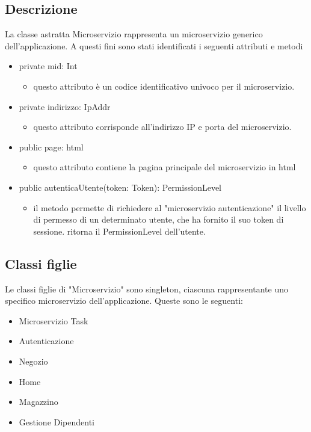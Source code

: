 \documentclass{report}
\begin{document}
\subsection*{Descrizione}
La classe astratta Microservizio rappresenta un microservizio generico dell'applicazione.
A questi fini sono stati identificati i seguenti attributi e metodi
\begin{itemize}
	\item private mid: Int 
	\begin{itemize}
		\item questo attributo è un codice identificativo univoco per il microservizio.
	\end{itemize}
	\item private indirizzo: IpAddr
	\begin{itemize}
		\item questo attributo corrisponde all'indirizzo IP e porta del microservizio.
	\end{itemize}
	\item public page: html
	\begin{itemize}
		\item questo attributo contiene la pagina principale del microservizio in html 
	\end{itemize}
	
	\item public autenticaUtente(token: Token): PermissionLevel 
	\begin{itemize}
		\item il metodo permette di richiedere al "microservizio autenticazione" il livello di permesso di un determinato utente, che ha fornito il suo token di sessione. ritorna il PermissionLevel dell'utente.
	\end{itemize}
\end{itemize}
\subsection*{Classi figlie}
Le classi figlie di "Microservizio" sono singleton, ciascuna rappresentante uno specifico microservizio dell'applicazione.
Queste sono le seguenti:
\begin{itemize}
	\item Microservizio Task
	\item Autenticazione
	\item Negozio
	\item Home
	\item Magazzino
	\item Gestione Dipendenti
\end{itemize}
\end{document}
